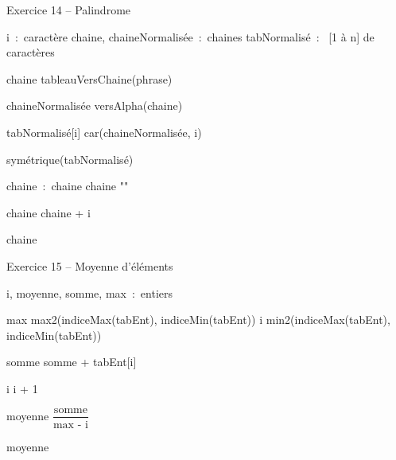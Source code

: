 \begin{Emphase}{Exercice 14 -- Palindrome}

\begin{pseudoN}


    \Decl i~:~caractère
    \Decl chaine, chaineNormalisée~:~chaines
    \Decl tabNormalisé~:~ [1 à n] de caractères

    \Let chaine \Gets tableauVersChaine(phrase)

    \Let chaineNormalisée \Gets versAlpha(chaine)


        \Let tabNormalisé[i] \Gets car(chaineNormalisée, i)
    \EndFor

    \Return symétrique(tabNormalisé)

\EndModule

    \Empty


    \Decl chaine~:~chaine
    \Let chaine \Gets ""


        \Let chaine \Gets chaine + i

    \EndFor

    \Return chaine

\EndModule


\end{pseudoN}

\end{Emphase}


\begin{Emphase}{Exercice 15 -- Moyenne d’éléments}

\begin{pseudoN}


    \Decl i, moyenne, somme, max~:~entiers

    \Let max \Gets max2(indiceMax(tabEnt), indiceMin(tabEnt))
    \Let i \Gets min2(indiceMax(tabEnt), indiceMin(tabEnt))


        \Let somme \Gets somme + tabEnt[i]

        \Let i \Gets i + 1

    \EndWhile

    \Let moyenne \Gets $\displaystyle \dfrac{\text{somme}}{\text{max - i}}$

    \Write moyenne


\EndModule

\end{pseudoN}

\end{Emphase}



